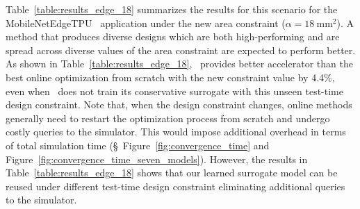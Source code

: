 %
Table~\ref{table:results_edge_18} summarizes the results for this scenario for the MobileNetEdgeTPU~\citep{edgetpu:arxiv:2020} application under the new area constraint ($\alpha = 18~\mathrm{mm}^2$).
%
A method that produces diverse designs which are both high-performing and are spread across diverse values of the area constraint are expected to perform better.
%
As shown in Table~\ref{table:results_edge_18}, \primemethodname\ provides better accelerator than the best online optimization from scratch with the new constraint value by 4.4\%, even when \primemethodname\ does not train its conservative surrogate with this unseen test-time design constraint.
%
Note that, when the design constraint changes, online methods generally need to restart the optimization process from scratch and undergo costly queries to the simulator.
%
This would impose additional overhead in terms of total simulation time (\S~Figure~\ref{fig:convergence_time} and Figure~\ref{fig:convergence_time_seven_models}). However, the results in Table~\ref{table:results_edge_18} shows that our learned surrogate model can be reused under different test-time design constraint eliminating additional queries to the simulator.
%



